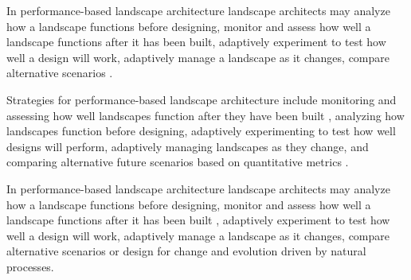 
In performance-based landscape architecture
landscape architects may
analyze how a landscape functions before designing,
monitor and assess how well a landscape functions after it has been built,
adaptively experiment to test how well a design will work,
adaptively manage a landscape as it changes,
compare alternative scenarios \cite{Lovell2015}.



Strategies for performance-based landscape architecture include
monitoring and assessing how well landscapes function
after they have been built \cite{Yang2016},
analyzing how landscapes function before designing,
adaptively experimenting to test how well designs will perform,
adaptively managing landscapes as they change, 
and comparing alternative future scenarios 
based on quantitative metrics \cite{Lovell2015}.



In performance-based landscape architecture
landscape architects may
analyze how a landscape functions before designing,
monitor and assess how well a landscape functions 
after it has been built \cite{Yang2016},
adaptively experiment to test how well a design will work,
adaptively manage a landscape as it changes,
compare alternative scenarios %
or design for change and evolution driven by natural processes.





\cite{Salafsky2001}

\cite{Lovell2015}


